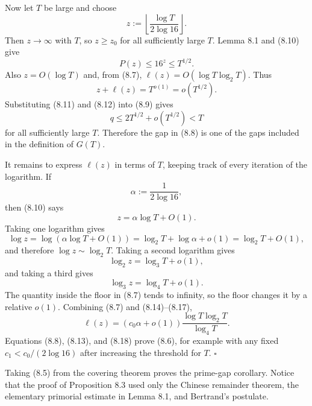 \documentclass[10pt,letterpaper]{article}
\newcommand{\qedmark}{\(\square\)}
\begin{document}
Now let $T$ be large and choose
\begin{equation}
z:=\left\lfloor\frac{\log T}{2\log16}\right\rfloor.
\tag{8.10}
\end{equation}
Then $z\to\infty$ with $T$, so $z\ge z_0$ for all sufficiently large $T$. Lemma 8.1 and (8.10) give
\begin{equation}
P(z)\le16^z\le T^{1/2}.
\tag{8.11}
\end{equation}
Also $z=O(\log T)$ and, from (8.7), $\ell(z)=O(\log T\log_2 T)$. Thus
\begin{equation}
z+\ell(z)=T^{o(1)}=o(T^{1/2}).
\tag{8.12}
\end{equation}
Substituting (8.11) and (8.12) into (8.9) gives
\begin{equation}
q\le2T^{1/2}+o(T^{1/2})<T
\tag{8.13}
\end{equation}
for all sufficiently large $T$. Therefore the gap in (8.8) is one of the gaps included in the definition of $G(T)$.

It remains to express $\ell(z)$ in terms of $T$, keeping track of every iteration of the logarithm. If
\[
\alpha:=\frac1{2\log16},
\]
then (8.10) says
\begin{equation}
z=\alpha\log T+O(1).
\tag{8.14}
\end{equation}
Taking one logarithm gives
\begin{equation}
\log z=\log(\alpha\log T+O(1))=\log_2 T+\log\alpha+o(1)=\log_2 T+O(1),
\tag{8.15}
\end{equation}
and therefore $\log z\sim\log_2 T$. Taking a second logarithm gives
\begin{equation}
\log_2 z=\log_3 T+o(1),
\tag{8.16}
\end{equation}
and taking a third gives
\begin{equation}
\log_3 z=\log_4 T+o(1).
\tag{8.17}
\end{equation}
The quantity inside the floor in (8.7) tends to infinity, so the floor changes it by a relative $o(1)$. Combining
(8.7) and (8.14)--(8.17),
\begin{equation}
\ell(z)=(c_0\alpha+o(1))\frac{\log T\log_2 T}{\log_4 T}.
\tag{8.18}
\end{equation}
Equations (8.8), (8.13), and (8.18) prove (8.6), for example with any fixed $c_1<c_0/(2\log16)$ after increasing
the threshold for $T$. \qedmark

Taking (8.5) from the covering theorem proves the prime-gap corollary. Notice that the proof of Proposition
8.3 used only the Chinese remainder theorem, the elementary primorial estimate in Lemma 8.1, and Bertrand's
postulate.
\end{document}
